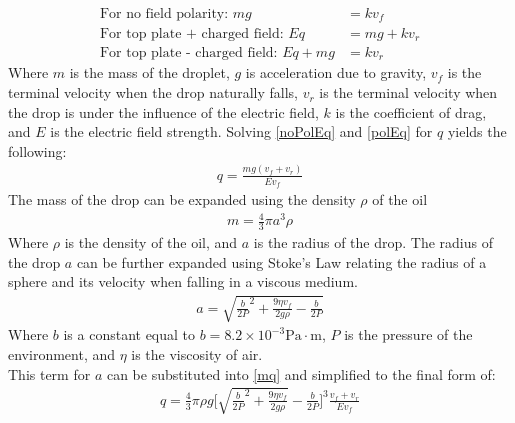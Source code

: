 \documentclass[rc]{physicsinprogress}
\begin{document}
\begin{align}
    \text{For no field polarity: } mg &= k v_f \label{noPolEq} \\
    \text{For top plate + charged field: } Eq &= mg+kv_r \label{polEq} \\
    \text{For top plate - charged field: } Eq + mg &= kv_r
\end{align}
Where $m$ is the mass of the droplet, $g$ is acceleration due to gravity, $v_f$ is the terminal velocity when the drop naturally falls, $v_r$ is the terminal velocity when the drop is under the influence of the electric field, $k$ is the coefficient of drag, and $E$ is the electric field strength. 
Solving \eqref{noPolEq} and \eqref{polEq} for $q$ yields the following:
\begin{align}
    q = \frac{mg(v_f+v_r)}{Ev_f} \label{mq}
\end{align}
The mass of the drop can be expanded using the density $\rho$ of the oil 
\begin{align}
    m = \frac{4}{3}\pi a^3\rho
\end{align}
Where $\rho$ is the density of the oil, and $a$ is the radius of the drop. 
The radius of the drop $a$ can be further expanded using Stoke's Law relating the radius of a sphere and its velocity when falling in a viscous medium. 
\begin{align}
    a = \sqrt{\frac{b}{2{P}}^2+\frac{9\eta v_f}{2g\rho}-\frac{b}{2P}}
\end{align}
Where $b$ is a constant equal to $b = 8.2 \times 10^{-3} \text{Pa} \cdot \text{m}$, $P$ is the pressure of the environment, and $\eta$ is the viscosity of air.
\\
This term for $a$ can be substituted into \eqref{mq} and simplified to the final form of:
\begin{align}
    q = \frac{4}{3}\pi \rho g \Bigg[\sqrt{\frac{b}{2P}^2+\frac{9\eta v_f}{2g\rho}}-\frac{b}{2P}\Bigg]^3\frac{v_f+v_r}{Ev_f}
    \label{bigQ}
\end{align}
\end{document}
